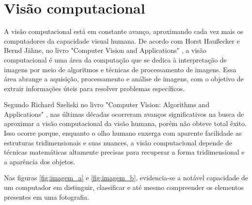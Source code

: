 \section{Visão computacional}

A visão computacional está em constante avanço, aproximando cada vez mais os computadores da capacidade visual humana. De acordo com Horst Haußecker e Bernd Jähne, no livro "Computer Vision and Applications" \space\cite{comp_vision_and_applications}, a visão computacional é uma área da computação que se dedica à interpretação de imagens por meio de algoritmos e técnicas de processamento de imagens. Essa área abrange a aquisição, processamento e análise de imagens, com o objetivo de extrair informações úteis para resolver problemas específicos.

Segundo Richard Szeliski no livro "Computer Vision: Algorithms and Applications" \space\cite{computer_vision_richard}, nas últimas décadas ocorreram avanços significativos na busca de aproximar a visão computacional da visão humana, porém não obteve total êxito. Isso ocorre porque, enquanto o olho humano enxerga com aparente facilidade as estruturas tridimensionais e suas nuances, a visão computacional depende de técnicas matemáticas altamente precisas para recuperar a forma tridimensional e a aparência dos objetos.

Nas figuras \cref{fig:imagem_a} e \cref{fig:imagem_b}, evidencia-se a notável capacidade de um computador em distinguir, classificar e até mesmo compreender os elementos presentes em uma fotografia.

